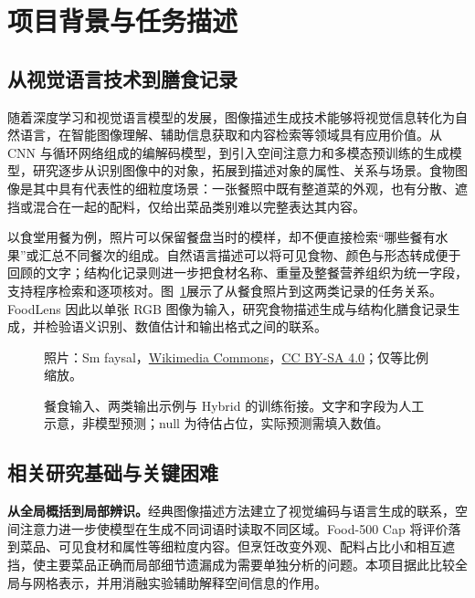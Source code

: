 \section{项目背景与任务描述}
\label{sec:background}
\subsection{从视觉语言技术到膳食记录}
随着深度学习和视觉语言模型的发展，图像描述生成技术能够将视觉信息转化为自然语言，在智能图像理解、辅助信息获取和内容检索等领域具有应用价值。从 CNN 与循环网络组成的编解码模型，到引入空间注意力和多模态预训练的生成模型，研究逐步从识别图像中的对象，拓展到描述对象的属性、关系与场景\cite{vinyals2015show,xu2015attend,bai2025qwen}。食物图像是其中具有代表性的细粒度场景：一张餐照中既有整道菜的外观，也有分散、遮挡或混合在一起的配料，仅给出菜品类别难以完整表达其内容。

以食堂用餐为例，照片可以保留餐盘当时的模样，却不便直接检索“哪些餐有水果”或汇总不同餐次的组成。自然语言描述可以将可见食物、颜色与形态转成便于回顾的文字；结构化记录则进一步把食材名称、重量及整餐营养组织为统一字段，支持程序检索和逐项核对。图~\ref{fig:meal-evidence}展示了从餐食照片到这两类记录的任务关系。FoodLens 因此以单张 RGB 图像为输入，研究食物描述生成与结构化膳食记录生成，并检验语义识别、数值估计和输出格式之间的联系。

\begin{figure}[!ht]
\centering

\caption{餐食输入、两类输出示例与 Hybrid 的训练衔接。文字和字段为人工示意，非模型预测；null 为待估占位，实际预测需填入数值。}
\label{fig:meal-evidence}
\vspace{2pt}
{\scriptsize\color{FLMid}照片：Sm faysal，\href{https://commons.wikimedia.org/wiki/File:Plain_rice_chicken_vegetables_lintel_\%26_lemon_lunch_platter_from_Bangladesh.jpg}{Wikimedia Commons}，\href{https://creativecommons.org/licenses/by-sa/4.0/}{CC BY-SA 4.0}；仅等比例缩放。}
\end{figure}

\subsection{相关研究基础与关键困难}
\textbf{从全局概括到局部辨识。}经典图像描述方法建立了视觉编码与语言生成的联系，空间注意力进一步使模型在生成不同词语时读取不同区域\cite{vinyals2015show,xu2015attend}。Food-500 Cap 将评价落到菜品、可见食材和属性等细粒度内容\cite{ma2023food}。但烹饪改变外观、配料占比小和相互遮挡，使主要菜品正确而局部细节遗漏成为需要单独分析的问题。本项目据此比较全局与网格表示，并用消融实验辅助解释空间信息的作用。

